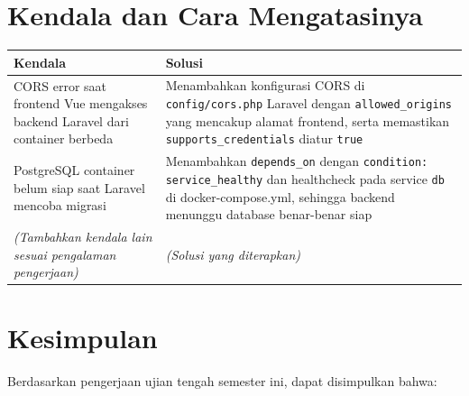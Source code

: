 \documentclass[12pt,letterpaper]{report}
\begin{document}
\section{Kendala dan Cara Mengatasinya}

\begin{longtable}{@{}p{}p{}@{}}
\toprule
\textbf{Kendala} & \textbf{Solusi} \\
\midrule
\endhead
CORS error saat frontend Vue mengakses backend Laravel dari container berbeda &
Menambahkan konfigurasi CORS di \texttt{config/cors.php} Laravel dengan \texttt{allowed\_origins} yang mencakup alamat frontend, serta memastikan \texttt{supports\_credentials} diatur \texttt{true} \\[8pt]

PostgreSQL container belum siap saat Laravel mencoba migrasi &
Menambahkan \texttt{depends\_on} dengan \texttt{condition: service\_healthy} dan healthcheck pada service \texttt{db} di docker-compose.yml, sehingga backend menunggu database benar-benar siap \\[8pt]

\textit{(Tambahkan kendala lain sesuai pengalaman pengerjaan)} &
\textit{(Solusi yang diterapkan)} \\
\bottomrule
\end{longtable}

\section{Kesimpulan}

Berdasarkan pengerjaan ujian tengah semester ini, dapat disimpulkan bahwa:
\end{document}
